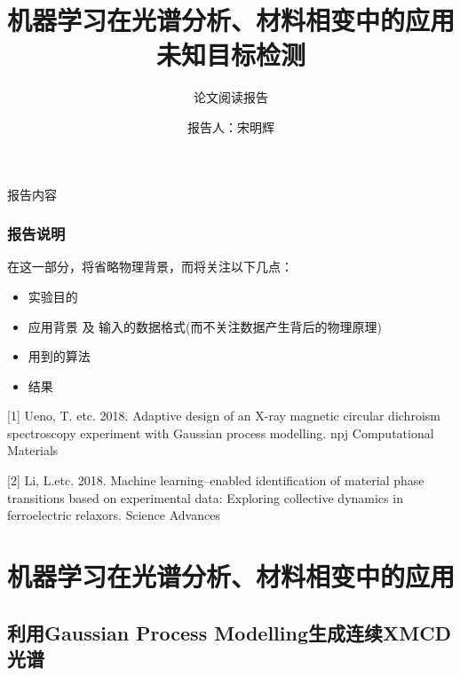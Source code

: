 \documentclass{beamer}
\title{机器学习在光谱分析、材料相变中的应用 \\
未知目标检测}
\subtitle{论文阅读报告}
\author{报告人：宋明辉}
\institute{HPCL}
\begin{document}
\frame[plain]{
\titlepage
}

\begin{frame}{报告内容}
\tableofcontents[
sectionstyle=show/show,
subsectionstyle=hide/hide/hide
]
\end{frame}

\AtBeginSection{
\begin{frame}
\tableofcontents[
currentsection,
]
\end{frame}
}

%

\begin{frame}
\frametitle{报告说明}

在这一部分，将省略物理背景，而将关注以下几点：
\begin{itemize}
\item 实验目的
\item 应用背景 及 输入的数据格式(而不关注数据产生背后的物理原理)
\item 用到的算法
\item 结果
\end{itemize}

%
%
{
\scriptsize
[1] Ueno, T. etc. 2018. Adaptive design of an X-ray magnetic circular dichroism spectroscopy experiment with Gaussian process modelling. npj Computational Materials

[2] Li, L.etc. 2018. Machine learning–enabled identification of material phase transitions based on experimental data: Exploring collective dynamics in ferroelectric relaxors. Science Advances
}
\end{frame}

\section{机器学习在光谱分析、材料相变中的应用}

\subsection{利用Gaussian Process Modelling生成连续XMCD光谱}
\end{document}
